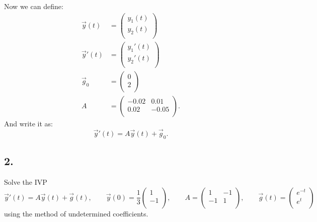 Now we can define:
\begin{align*}
  \Vec{y}(t) &= \begin{pmatrix}
  y_1(t)\\
  y_2(t)\\
  \end{pmatrix} \\
  \Vec{y}'(t) &= \begin{pmatrix}
  y_1'(t)\\
  y_2'(t)\\
  \end{pmatrix} \\
  \Vec{g}_0 &= \begin{pmatrix}
  0\\
  2\\
  \end{pmatrix} \\
  A &= \begin{pmatrix}
  -\num{0,02}  & \num{0,01} \\
  \num{0,02}  & -\num{0,05} \\
  \end{pmatrix}
.\end{align*}
And write it as:
\[ 
\Vec{y}'(t) = A \Vec{y}(t) + \Vec{g}_0
.\]



\subsection*{2.} Solve the IVP
\[ 
\Vec{y}'(t) = A \Vec{y}(t) + \Vec{g} (t), \qquad \Vec{y}(0) = \frac{1}{3} \begin{pmatrix}
1\\
-1\\
\end{pmatrix},\qquad  A = \begin{pmatrix}
1 & -1\\
-1 & 1\\
\end{pmatrix}, \qquad \Vec{g}(t) = \begin{pmatrix}
 e^{-t}\\
 e^{t}\\
\end{pmatrix}
\]
using the method of undetermined coefficients.

